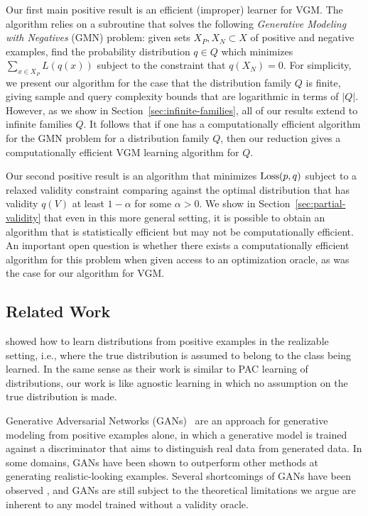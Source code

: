 Our first main positive result is an efficient (improper) learner for VGM. The algorithm relies on a subroutine that solves the following {\em Generative Modeling with Negatives} (GMN) problem: given sets $X_P, X_N \subset X$ of positive and negative examples, find the probability distribution $q \in Q$ which minimizes $\sum_{x \in X_P} L(q(x))$ subject to the constraint that $q(X_N)=0$. For simplicity, we present our algorithm for the case that the distribution family $Q$ is finite, giving sample and query complexity bounds that are logarithmic in terms of $|Q|$. However, as we show in Section~\ref{sec:infinite-families}, all of our results extend to infinite families $Q$. It follows that if one has a computationally efficient algorithm for the GMN problem for a distribution family $Q$, then our reduction gives a computationally efficient VGM learning algorithm for $Q$.

Our second positive result is an algorithm that minimizes $\text{Loss}(p,q)$ subject to a relaxed validity constraint comparing against the optimal distribution that has validity $q(V)$ at least $1-\alpha$ for some $\alpha>0$. We show in Section~\ref{sec:partial-validity} that even in this more general setting, it is possible to obtain an algorithm that is statistically efficient but may not be computationally efficient. An important open question is whether there exists a computationally efficient algorithm for this problem when given access to an optimization oracle, as was the case for our algorithm for VGM.

\subsection{Related Work}
\cite{KearnsMRRSS94} showed how to learn distributions from positive examples in the realizable setting, i.e., where the true distribution is assumed to belong to the class being learned. In the same sense as their work is similar to PAC learning \citet{Valiant84} of distributions, our work is like agnostic learning \citet{KearnsSS94} in which no assumption on the true distribution is made. 

Generative Adversarial Networks (GANs)~\cite{GoodfellowPMXWOCB14} are an approach for generative modeling from positive examples alone, in which a generative model is trained against a discriminator that aims to distinguish real data from generated data. In some domains, GANs have been shown to outperform other methods at generating realistic-looking examples. Several shortcomings of GANs have been observed \citet{AroraRZ18}, and GANs are still subject to the theoretical limitations we argue are inherent to any model trained without a validity oracle. 

